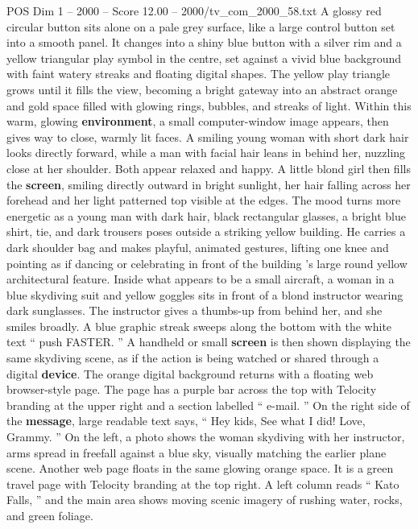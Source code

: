\begin{textsample}{POS Dim 1 – 2000 – Score 12.00 – 2000/tv\_com\_2000\_58.txt}  \label{ex:f1_pos_039}
A glossy red circular button sits alone on a pale grey surface, like a large control button set into a smooth panel.
It changes into a shiny blue button with a silver rim and a yellow triangular play symbol in the centre, set against a vivid blue background with faint watery streaks and floating digital shapes.
The yellow play triangle grows until it fills the view, becoming a bright gateway into an abstract orange and gold space filled with glowing rings, bubbles, and streaks of light.
Within this warm, glowing \textbf{environment}, a small computer-window image appears, then gives way to close, warmly lit faces.
A smiling young woman with short dark hair looks directly forward, while a man with facial hair leans in behind her, nuzzling close at her shoulder.
Both appear relaxed and happy.
A little blond girl then fills the \textbf{screen}, smiling directly outward in bright sunlight, her hair falling across her forehead and her light patterned top visible at the edges.
The mood turns more energetic as a young man with dark hair, black rectangular glasses, a bright blue shirt, tie, and dark trousers poses outside a striking yellow building.
He carries a dark shoulder bag and makes playful, animated gestures, lifting one knee and pointing as if dancing or celebrating in front of the building ’s large round yellow architectural feature.
Inside what appears to be a small aircraft, a woman in a blue skydiving suit and yellow goggles sits in front of a blond instructor wearing dark sunglasses.
The instructor gives a thumbs-up from behind her, and she smiles broadly.
A blue graphic streak sweeps along the bottom with the white text “ push FASTER. ” A handheld or small \textbf{screen} is then shown displaying the same skydiving scene, as if the action is being watched or shared through a digital \textbf{device}.
The orange digital background returns with a floating web browser-style page.
The page has a purple bar across the top with Telocity branding at the upper right and a section labelled “ e-mail. ” On the right side of the \textbf{message}, large readable text says, “ Hey kids, See what I did!
Love, Grammy. ” On the left, a photo shows the woman skydiving with her instructor, arms spread in freefall against a blue sky, visually matching the earlier plane scene.
Another web page floats in the same glowing orange space.
It is a green travel page with Telocity branding at the top right.
A left column reads “ Kato Falls, ” and the main area shows moving scenic imagery of rushing water, rocks, and green foliage.

\end{textsample}
